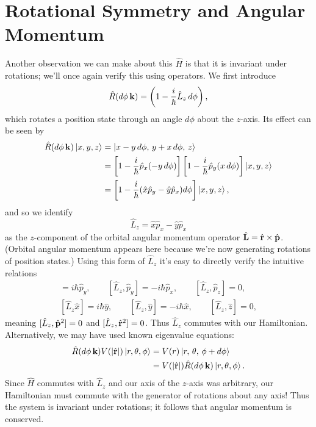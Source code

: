 \documentclass[../p116main.tex]{subfiles}
\begin{document}
\section{Rotational Symmetry and Angular Momentum}
Another observation we can make about this $\hat H$ is that it is invariant under rotations; we'll once again verify this using operators.
We first introduce
\[ \hat R(d\phi \,\mathbf{k}) = \left( 1 - \frac{i}{\hbar} \hat L_z \, d\phi \right), \]
which rotates a position state through an angle $d\phi$ about the $z$-axis.
Its effect can be seen by
\begin{align*}
    \hat R(d\phi \,\mathbf{k}) \left| x,y,z \right> &= \left| x - y \,d\phi, \, y + x \,d\phi, \, z \right> \\
    &= \left[ 1 - \frac{i}{\hbar} \hat p_x (-y \,d\phi) \right] \left[ 1 - \frac{i}{\hbar} \hat p_y (x \,d\phi) \right] \left| x,y,z \right> \\
    &= \left[ 1 - \frac{i}{\hbar} (\hat x \hat p_y - \hat y \hat p_x) d\phi \right] \left| x,y,z \right>,
\end{align*}
and so we identify
\[ \hat L_z = \hat x \hat p_x - \hat y \hat p_x \]
as the $z$-component of the orbital angular momentum operator $\hat{\mathbf{L}} = \hat{\mathbf{r}} \times \hat{\mathbf{p}}$.
(Orbital angular momentum appears here because we're now generating rotations of position states.)
Using this form of $\hat L_z$ it's easy to directly verify the intuitive relations
\begin{gather*}
    [\hat L_z, \hat p_x] = i\hbar \hat p_y, \qquad [\hat L_z, \hat p_y] = -i\hbar \hat p_x, \qquad [\hat L_z, \hat p_z] = 0, \\
    [\hat L_z \hat x] = i\hbar \hat y, \qquad [\hat L_z, \hat y] = -i\hbar \hat x, \qquad [\hat L_z, \hat z] = 0,
\end{gather*}
meaning $[\hat L_z, \hat{\mathbf{p}}^2] = 0$ and $[\hat L_z, \hat{\mathbf{r}}^2] = 0$.
Thus $\hat L_z$ commutes with our Hamiltonian.
Alternatively, we may have used known eigenvalue equations:
\begin{align*}
    \hat R(d\phi \,\mathbf{k}) V(|\hat{\mathbf{r}}|) \left| r, \theta, \phi \right> &= V(r) \left| r, \, \theta, \, \phi + d\phi \right> \\
    &= V(|\hat{\mathbf{r}}|) \hat R(d\phi \,\mathbf{k}) \left| r, \theta, \phi \right>.
\end{align*}
Since $\hat H$ commutes with $\hat L_z$ and our axis of the $z$-axis was arbitrary, our Hamiltonian must commute with the generator of rotations about any axis!
Thus the system is invariant under rotations; it follows that angular momentum is conserved.
\end{document}
